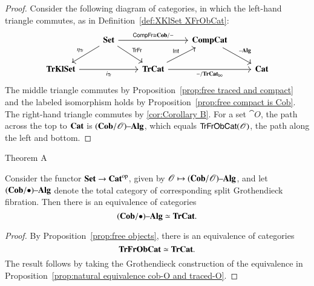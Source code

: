 \documentclass[12pt,oneside,article,draft]{memoir}
\begin{document}
\begin{proof}

Consider the following diagram of categories, in which the left-hand triangle commutes, as in Definition~\ref{def:XKlSet XFrObCat}:
$$
\begin{tikzcd}
&\Set\ar[rr,"\Fun{CompFr}\iso\Cat{Cob/-}"]\ar[dl,"\eta_{\Fun{Tr}}"']\ar[dr,"\Fun{TrFr}"]&&\Cat{CompCat}\ar[dr,"\alg"]\\
\Cat{TrKlSet}\ar[rr,"i_{\Fun{Tr}}"']&&\Cat{TrCat}\ar[ur,"\Fun{Int}"]\ar[rr,"-/\TrCat_{\bo}"']&&\Cat{Cat}
\end{tikzcd}
$$
The middle triangle commutes by Proposition~\ref{prop:free traced and compact} and the labeled isomorphism holds by Proposition~\ref{prop:free compact is Cob}. The right-hand triangle commutes by \ref{cor:Corollary B}. For a set $\cat{O}$, the path across the top to $\mathbf{Cat}$ is $(\mathbf{Cob}/\mathscr{O}){\text \textendash}\mathbf{Alg}$, which equals $\mathsf{TrFrObCat}(\mathscr{O})$, the path along the left and bottom.

\end{proof}

%
%
%
\begin{named}{Theorem A}\label{thm:Theorem A}

Consider the functor $\mathbf{Set}\to{\mathbf{Cat}}^{\text{op}}$, given by $\mathscr{O}\mapsto(\mathbf{Cob}/\mathscr{O}){\text \textendash}\mathbf{Alg}$, and let $(\mathbf{Cob}/\bullet){\text \textendash}\mathbf{Alg}$ denote the total category of corresponding split Grothendieck fibration. Then there is an equivalence of categories
$$(\mathbf{Cob}/\bullet){\text \textendash}\mathbf{Alg}\simeq\mathbf{TrCat}.$$

\end{named}

\begin{proof}

By Proposition~\ref{prop:free objects}, there is an equivalence of categories 
$$\mathbf{TrFrObCat}\simeq\mathbf{TrCat}.$$ 
The result follows by taking the Grothendieck construction of the equivalence in Proposition~\ref{prop:natural equivalence cob-O and traced-O}.

\end{proof}
\end{document}
